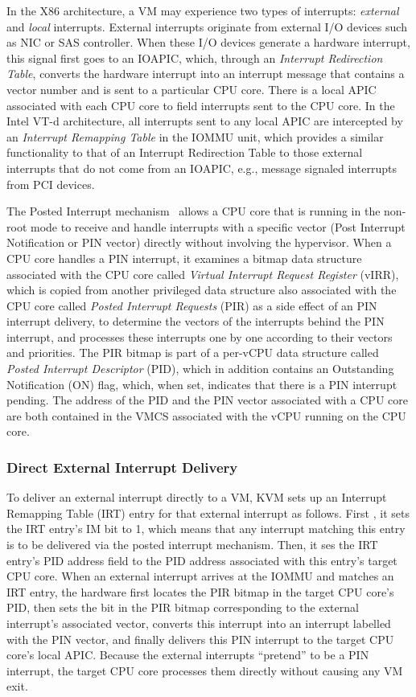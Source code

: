 In the X86 architecture, a VM may experience two types of interrupts: {\em external} and {\em local} interrupts.
External interrupts originate from external I/O devices such as NIC or SAS controller.
When these I/O devices generate a hardware interrupt, this signal first goes to an IOAPIC, which, through an {\em Interrupt Redirection Table}, 
converts the hardware interrupt into an interrupt message that contains a vector number and is sent to a particular CPU core.
There is a local APIC associated with each CPU core to field interrupts sent to the CPU core.
In the Intel VT-d architecture, all interrupts sent to any local APIC are intercepted by  an {\em Interrupt Remapping Table} in the IOMMU unit, 
which provides a similar functionality to that of an Interrupt Redirection Table
to those external interrupts that do not come from an IOAPIC, e.g., message signaled interrupts from PCI devices.

The Posted Interrupt mechanism~\cite{intelvtd-paper,intelvtd-manual} allows a CPU core that is running in the non-root mode to receive and handle interrupts with a specific vector
(Post Interrupt Notification or PIN vector) directly without involving the hypervisor.
When a CPU core handles a PIN interrupt, it examines a bitmap data structure associated with the CPU core called {\em Virtual Interrupt Request Register} (vIRR),
which is copied from another privileged data structure also associated with the CPU core called {\em Posted Interrupt Requests} (PIR) as a side effect of an PIN interrupt delivery,  
to determine the vectors of the interrupts behind the PIN interrupt, and processes these interrupts one by one according to their vectors and priorities.
The PIR bitmap is part of a per-vCPU data structure called {\em Posted Interrupt Descriptor} (PID), which in addition contains an Outstanding Notification (ON) flag, which, when set, indicates that there is a PIN interrupt pending.  
The address of the PID and the PIN vector associated with a CPU core are both contained in the VMCS associated with the vCPU running on the CPU core.

\subsubsection{Direct External Interrupt Delivery}

To deliver an external interrupt directly to a VM, KVM sets up an Interrupt Remapping Table (IRT) entry for that external interrupt as follows.
First , it sets the IRT entry's IM bit to 1, which means that any interrupt matching this entry is to be delivered via the posted interrupt mechanism.  
Then, it ses the IRT entry's PID address field to the PID address associated with this entry's target CPU core. 
When an external interrupt arrives at the IOMMU and matches an IRT entry, the 
hardware first locates the PIR bitmap in the target CPU core's PID, then sets the bit in the PIR bitmap corresponding to the external interrupt's associated vector,
converts this interrupt into an interrupt labelled with the PIN vector, and finally delivers this PIN interrupt to the target CPU core's local APIC.
Because the external interrupts ``pretend'' to be a PIN interrupt, the target CPU core processes them directly without causing any VM exit.

